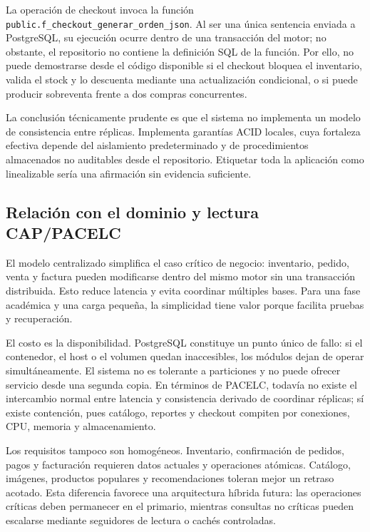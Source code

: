 \documentclass[11pt,a4paper]{article}
\begin{document}
La operación de checkout invoca la función \texttt{public.f\_checkout\_generar\_orden\_json}. Al ser una única sentencia enviada a PostgreSQL, su ejecución ocurre dentro de una transacción del motor; no obstante, el repositorio no contiene la definición SQL de la función. Por ello, no puede demostrarse desde el código disponible si el checkout bloquea el inventario, valida el stock y lo descuenta mediante una actualización condicional, o si puede producir sobreventa frente a dos compras concurrentes.

La conclusión técnicamente prudente es que el sistema no implementa un modelo de consistencia entre réplicas. Implementa garantías ACID locales, cuya fortaleza efectiva depende del aislamiento predeterminado y de procedimientos almacenados no auditables desde el repositorio. Etiquetar toda la aplicación como linealizable sería una afirmación sin evidencia suficiente.

\subsection{Relación con el dominio y lectura CAP/PACELC}

El modelo centralizado simplifica el caso crítico de negocio: inventario, pedido, venta y factura pueden modificarse dentro del mismo motor sin una transacción distribuida. Esto reduce latencia y evita coordinar múltiples bases. Para una fase académica y una carga pequeña, la simplicidad tiene valor porque facilita pruebas y recuperación.

El costo es la disponibilidad. PostgreSQL constituye un punto único de fallo: si el contenedor, el host o el volumen quedan inaccesibles, los módulos dejan de operar simultáneamente. El sistema no es tolerante a particiones y no puede ofrecer servicio desde una segunda copia. En términos de PACELC, todavía no existe el intercambio normal entre latencia y consistencia derivado de coordinar réplicas; sí existe contención, pues catálogo, reportes y checkout compiten por conexiones, CPU, memoria y almacenamiento.

Los requisitos tampoco son homogéneos. Inventario, confirmación de pedidos, pagos y facturación requieren datos actuales y operaciones atómicas. Catálogo, imágenes, productos populares y recomendaciones toleran mejor un retraso acotado. Esta diferencia favorece una arquitectura híbrida futura: las operaciones críticas deben permanecer en el primario, mientras consultas no críticas pueden escalarse mediante seguidores de lectura o cachés controladas.
\end{document}
